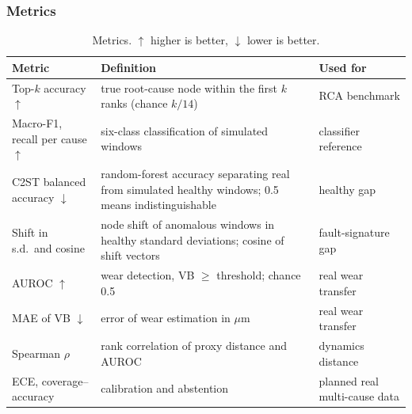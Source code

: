 \documentclass[11pt]{article}
\begin{document}
\subsubsection{Metrics}
\begin{table}[t]\centering\small
\caption{Metrics. $\uparrow$ higher is better, $\downarrow$ lower is better.}\label{tab:metrics}
\begin{tabular}{p{3.6cm}p{6.6cm}p{4.0cm}}\toprule
Metric & Definition & Used for\\\midrule
Top-$k$ accuracy $\uparrow$ & true root-cause node within the first $k$ ranks (chance $k/14$) & RCA benchmark\\
Macro-F1, recall per cause $\uparrow$ & six-class classification of simulated windows & classifier reference\\
C2ST balanced accuracy $\downarrow$ & random-forest accuracy separating real from simulated healthy windows; 0.5 means indistinguishable & healthy gap\\
Shift in s.d.\ and cosine & node shift of anomalous windows in healthy standard deviations; cosine of shift vectors & fault-signature gap\\
AUROC $\uparrow$ & wear detection, VB $\ge$ threshold; chance 0.5 & real wear transfer\\
MAE of VB $\downarrow$ & error of wear estimation in $\mu$m & real wear transfer\\
Spearman $\rho$ & rank correlation of proxy distance and AUROC & dynamics distance\\
ECE, coverage--accuracy & calibration and abstention & planned real multi-cause data\\\bottomrule
\end{tabular}
\end{table}
\end{document}
